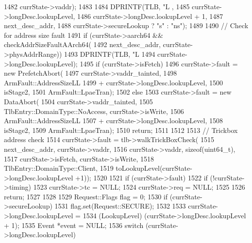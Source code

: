 \begin{DoxyCode}
{{{1482                 currState->vaddr);
1483 
1484             DPRINTF(TLB, "L%
      ,
1485                     currState->longDesc.lookupLevel,
1486                     currState->longDesc.lookupLevel + 1,
1487                     next_desc_addr,
1488                     currState->secureLookup ? "s" : "ns");
1489 
1490             // Check for address size fault
1491             if (currState->aarch64 && checkAddrSizeFaultAArch64(
1492                     next_desc_addr, currState->physAddrRange)) {
1493                 DPRINTF(TLB, "L%
1494                         currState->longDesc.lookupLevel);
1495                 if (currState->isFetch)
1496                     currState->fault = new PrefetchAbort(
1497                         currState->vaddr_tainted,
1498                         ArmFault::AddressSizeLL
1499                         + currState->longDesc.lookupLevel,
1500                         isStage2,
1501                         ArmFault::LpaeTran);
1502                 else
1503                     currState->fault = new DataAbort(
1504                         currState->vaddr_tainted,
1505                         TlbEntry::DomainType::NoAccess, currState->isWrite,
1506                         ArmFault::AddressSizeLL
1507                         + currState->longDesc.lookupLevel,
1508                         isStage2,
1509                         ArmFault::LpaeTran);
1510                 return;
1511             }
1512 
1513             // Trickbox address check
1514             currState->fault = tlb->walkTrickBoxCheck(
1515                             next_desc_addr, currState->vaddr,
1516                             currState->vaddr, sizeof(uint64_t),
1517                             currState->isFetch, currState->isWrite,
1518                             TlbEntry::DomainType::Client,
1519                             toLookupLevel(currState->longDesc.lookupLevel +1));
1520 
1521             if (currState->fault) {
1522                 if (!currState->timing) {
1523                     currState->tc = NULL;
1524                     currState->req = NULL;
1525                 }
1526                 return;
1527             }
1528 
1529             Request::Flags flag = 0;
1530             if (currState->secureLookup)
1531                 flag.set(Request::SECURE);
1532 
1533             currState->longDesc.lookupLevel =
1534                 (LookupLevel) (currState->longDesc.lookupLevel + 1);
1535             Event *event = NULL;
1536             switch (currState->longDesc.lookupLevel) {
}}}}
\end{DoxyCode}
